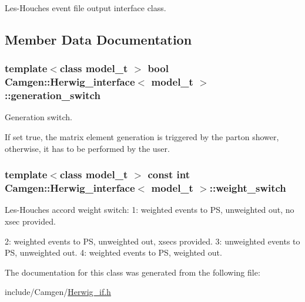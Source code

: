 Les-\/\+Houches event file output interface class. 

\subsection{Member Data Documentation}
\hypertarget{a00283_a6fd3ab282136d8ceb709e5030e9f48a3}{}
\subsubsection[{generation\+\_\+switch}]{\setlength{\rightskip}{0pt plus 5cm}template$<$class model\+\_\+t $>$ bool {\bf Camgen\+::\+Herwig\+\_\+interface}$<$ model\+\_\+t $>$\+::generation\+\_\+switch}\label{a00283_a6fd3ab282136d8ceb709e5030e9f48a3}


Generation switch. 

If set true, the matrix element generation is triggered by the parton shower, otherwise, it has to be performed by the user. \hypertarget{a00283_a2dedaf0e690349d499044ca1aa0ab95b}{}
\subsubsection[{weight\+\_\+switch}]{\setlength{\rightskip}{0pt plus 5cm}template$<$class model\+\_\+t $>$ const int {\bf Camgen\+::\+Herwig\+\_\+interface}$<$ model\+\_\+t $>$\+::weight\+\_\+switch}\label{a00283_a2dedaf0e690349d499044ca1aa0ab95b}


Les-\/\+Houches accord weight switch\+: 1\+: weighted events to P\+S, unweighted out, no xsec provided. 

2\+: weighted events to P\+S, unweighted out, xsecs provided. 3\+: unweighted events to P\+S, unweighted out. 4\+: weighted events to P\+S, weighted out. 

The documentation for this class was generated from the following file\+:\begin{DoxyCompactItemize}
\item 
include/\+Camgen/\hyperlink{a00664}{Herwig\+\_\+if.\+h}\end{DoxyCompactItemize}
